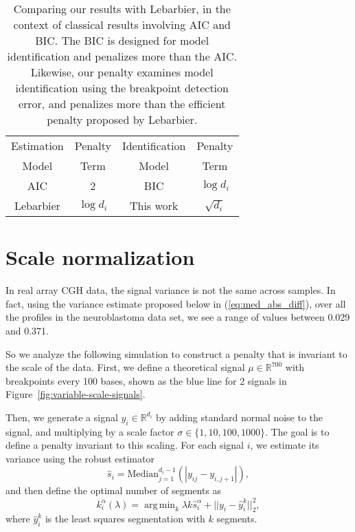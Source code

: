\documentclass{jsfds} %
\DeclareMathOperator*{\argmin}{arg\,min}
\newcommand{\RR}{\mathbb{R}}
\begin{document}
\begin{table}[H]
  \centering
  \begin{tabular}{cc|cc}
     Estimation & Penalty & Identification & Penalty \\
     Model & Term & Model & Term\\
     \hline
     AIC & 2 & BIC & $\log d_i$\\
     Lebarbier & $\log d_i$ & This work & $\sqrt{d_i}$\\
  \end{tabular}
  \caption{Comparing our results with Lebarbier, 
in the context of classical results involving AIC and BIC. 
The BIC is designed for model identification and penalizes more than the AIC.
Likewise, our penalty examines model identification using the breakpoint
detection error, and penalizes more than the efficient penalty proposed
by Lebarbier.}
  \label{tab:AIC-BIC}
\end{table}

\newpage

\section{Scale normalization}
\label{variable_scale}
In real array CGH data, the signal variance is not the same across
samples. In fact, using the variance estimate proposed below in
(\ref{eq:med_abs_diff}), over all the profiles in the
neuroblastoma data set, we see a range of values between 0.029 and
0.371.

So we analyze the following simulation to construct a penalty that is
invariant to the scale of the data. First, we define a theoretical
signal $\mu\in\RR^{700}$ with breakpoints every 100 bases, shown as
the blue line for 2 signals in
Figure~\ref{fig:variable-scale-signals}.

Then, we generate a signal $y_i\in\RR^{d_i}$ by adding standard normal
noise to the signal, and multiplying by a scale factor
$\sigma\in\{1,10,100,1000\}$. The goal is to define a penalty
invariant to this scaling.
For each signal $i$, we estimate its
variance using the robust estimator
\begin{equation}
  \label{eq:med_abs_diff}
  \hat s_i = \text{Median}_{j=1}^{d_i-1}
\left(|y_{ij}-y_{i,j+1}|\right),
\end{equation}
and then define the optimal number of segments as
\begin{equation}
  \label{eq:kstar_shat}
  k_i^\alpha(\lambda) = \argmin_k \lambda k \hat s_i^\alpha 
+ ||y_i - \hat y_i^k||^2_2,
\end{equation}
where $\hat y_i^k$ is the least squares segmentation with $k$
segments.
\end{document}
